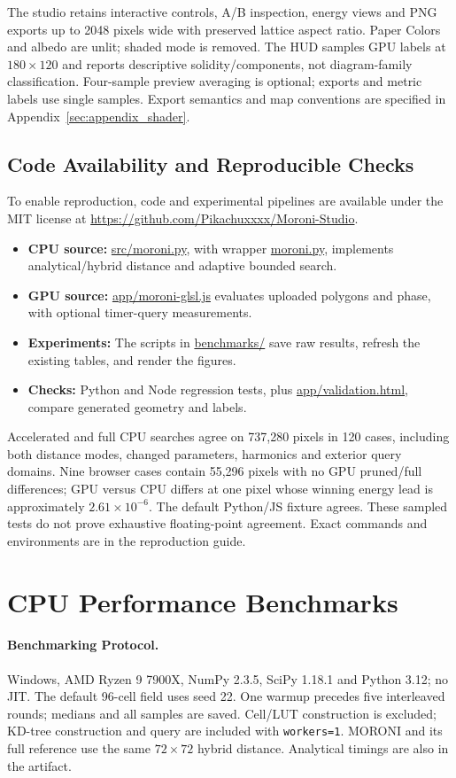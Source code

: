 \documentclass[sigconf,nonacm]{acmart}
\begin{document}
The studio retains interactive controls, A/B inspection, energy views and
PNG exports up to 2048 pixels wide with preserved lattice aspect ratio.
Paper Colors and albedo are unlit; shaded mode is removed. The HUD samples
GPU labels at $180\times120$ and reports descriptive solidity/components,
not diagram-family classification. Four-sample preview averaging is optional;
exports and metric labels use single samples. Export semantics and map
conventions are specified in Appendix~\ref{sec:appendix_shader}.

\subsection{Code Availability and Reproducible Checks}
To enable reproduction, code and experimental pipelines are available
under the MIT license at \url{https://github.com/Pikachuxxxx/Moroni-Studio}.
\begin{itemize}
\item \textbf{CPU source:} \url{src/moroni.py}, with wrapper \url{moroni.py},
implements analytical/hybrid distance and adaptive bounded search.
\item \textbf{GPU source:} \url{app/moroni-glsl.js} evaluates uploaded
polygons and phase, with optional timer-query measurements.
\item \textbf{Experiments:} The scripts in \url{benchmarks/} save raw results, refresh the existing tables, and render the figures.
\item \textbf{Checks:} Python and Node regression tests, plus
\url{app/validation.html}, compare generated geometry and labels.
\end{itemize}
Accelerated and full CPU searches agree on 737,280 pixels in 120 cases,
including both distance modes, changed parameters, harmonics and exterior
query domains. Nine browser cases contain 55,296 pixels with no GPU
pruned/full differences; GPU versus CPU differs at one pixel whose winning
energy lead is approximately $2.61\times10^{-6}$. The default Python/JS
fixture agrees. These sampled tests do not prove exhaustive floating-point
agreement. Exact commands and environments are in the reproduction guide.

\section{CPU Performance Benchmarks}
\label{sec:perf}

\paragraph{Benchmarking Protocol.} Windows, AMD Ryzen 9 7900X, NumPy 2.3.5,
SciPy 1.18.1 and Python 3.12; no JIT. The default 96-cell field uses seed 22.
One warmup precedes five interleaved rounds; medians and all samples are
saved. Cell/LUT construction is excluded; KD-tree construction and query
are included with \texttt{workers=1}. MORONI and its full reference use the
same $72\times72$ hybrid distance. Analytical timings are also in the artifact.
\end{document}
